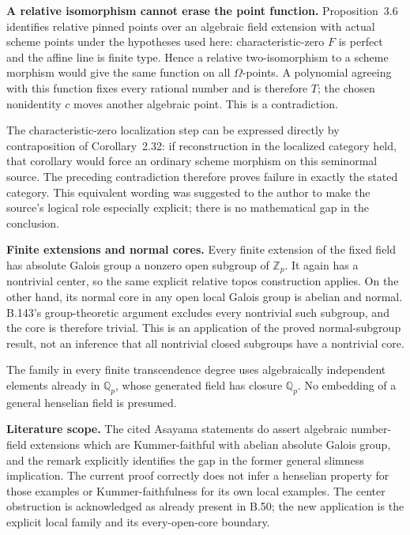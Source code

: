 \medskip\noindent\textbf{A relative isomorphism cannot erase the point function.}
Proposition~3.6 identifies relative pinned points
over an algebraic field extension with actual
scheme points under the hypotheses used here:
characteristic-zero $F$ is perfect and the
affine line is finite type.  Hence a relative
two-isomorphism to a scheme morphism would give
the same function on all $\Omega$-points.
A polynomial agreeing with this function fixes
every rational number and is therefore $T$;
the chosen nonidentity $c$ moves another
algebraic point.  This is a contradiction.

The characteristic-zero localization step can
be expressed directly by contraposition of
Corollary~2.32: if reconstruction in the
localized category held, that corollary would
force an ordinary scheme morphism on this
seminormal source.  The preceding contradiction
therefore proves failure in exactly the stated
category.  This equivalent wording was suggested
to the author to make the source's logical role
especially explicit; there is no mathematical
gap in the conclusion.

\medskip\noindent\textbf{Finite extensions and normal cores.}
Every finite extension of the fixed field has
absolute Galois group a nonzero open subgroup
of $\mathbb Z_p$.  It again has a nontrivial
center, so the same explicit relative topos
construction applies.  On the other hand, its
normal core in any open local Galois group is
abelian and normal.  B.143's group-theoretic
argument excludes every nontrivial such subgroup,
and the core is therefore trivial.  This is an
application of the proved normal-subgroup result,
not an inference that all nontrivial closed
subgroups have a nontrivial core.

The family in every finite transcendence degree
uses algebraically independent elements already
in $\mathbb Q_p$, whose generated field has
closure $\mathbb Q_p$.  No embedding of a
general henselian field is presumed.

\medskip\noindent\textbf{Literature scope.}
The cited Asayama statements do assert algebraic
number-field extensions which are Kummer-faithful
with abelian absolute Galois group, and the remark
explicitly identifies the gap in the former general
slimness implication.  The current proof correctly
does not infer a henselian property for those
examples or Kummer-faithfulness for its own local
examples.  The center obstruction is acknowledged
as already present in B.50; the new application is
the explicit local family and its every-open-core
boundary.

